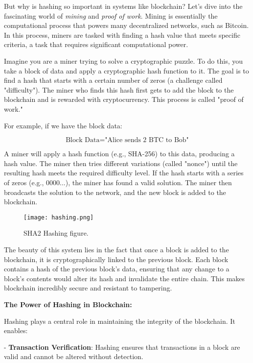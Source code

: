 \documentclass[12pt,a4paper]{report}
\begin{document}
But why is hashing so important in systems like blockchain? Let’s dive into the fascinating world of \textit{mining} and \textit{proof of work}. Mining is essentially the computational process that powers many decentralized networks, such as Bitcoin. In this process, miners are tasked with finding a hash value that meets specific criteria, a task that requires significant computational power.

Imagine you are a miner trying to solve a cryptographic puzzle. To do this, you take a block of data and apply a cryptographic hash function to it. The goal is to find a hash that starts with a certain number of zeros (a challenge called "difficulty"). The miner who finds this hash first gets to add the block to the blockchain and is rewarded with cryptocurrency. This process is called "proof of work."


For example, if we have the block data:

\[
\text{Block Data} = \text{"Alice sends 2 BTC to Bob"}
\]

A miner will apply a hash function (e.g., SHA-256) to this data, producing a hash value. The miner then tries different variations (called "nonce") until the resulting hash meets the required difficulty level. If the hash starts with a series of zeros (e.g., 0000...), the miner has found a valid solution. The miner then broadcasts the solution to the network, and the new block is added to the blockchain.

\begin{figure}[ht]
    \centering
    \texttt{[image: hashing.png]}
    \caption{SHA2 Hashing figure.}
    \label{fig:hashing}
\end{figure}

The beauty of this system lies in the fact that once a block is added to the blockchain, it is cryptographically linked to the previous block. Each block contains a hash of the previous block’s data, ensuring that any change to a block’s contents would alter its hash and invalidate the entire chain. This makes blockchain incredibly secure and resistant to tampering.

\textbf{The Power of Hashing in Blockchain:}

Hashing plays a central role in maintaining the integrity of the blockchain. It enables:

    - \textbf{Transaction Verification}: Hashing ensures that transactions in a block are valid and cannot be altered without detection.
    
\end{document}
